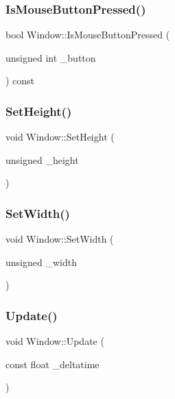 \subsubsection{\texorpdfstring{Is\+Mouse\+Button\+Pressed()}{IsMouseButtonPressed()}}
{\footnotesize\ttfamily bool Window\+::\+Is\+Mouse\+Button\+Pressed (\begin{DoxyParamCaption}\item[{unsigned int}]{\+\_\+button }\end{DoxyParamCaption}) const}

\mbox{\label{class_window_a28843b64d34ec006f51274e154a81f00}} 
\subsubsection{\texorpdfstring{Set\+Height()}{SetHeight()}}
{\footnotesize\ttfamily void Window\+::\+Set\+Height (\begin{DoxyParamCaption}\item[{unsigned}]{\+\_\+height }\end{DoxyParamCaption})}

\mbox{\label{class_window_a2fba7009a94faaef315b90509124a65c}} 
\subsubsection{\texorpdfstring{Set\+Width()}{SetWidth()}}
{\footnotesize\ttfamily void Window\+::\+Set\+Width (\begin{DoxyParamCaption}\item[{unsigned}]{\+\_\+width }\end{DoxyParamCaption})}

\mbox{\label{class_window_a86a9ed5f891a93f0c3c44d8577be4e71}} 
\subsubsection{\texorpdfstring{Update()}{Update()}}
{\footnotesize\ttfamily void Window\+::\+Update (\begin{DoxyParamCaption}\item[{const float}]{\+\_\+deltatime }\end{DoxyParamCaption})}

